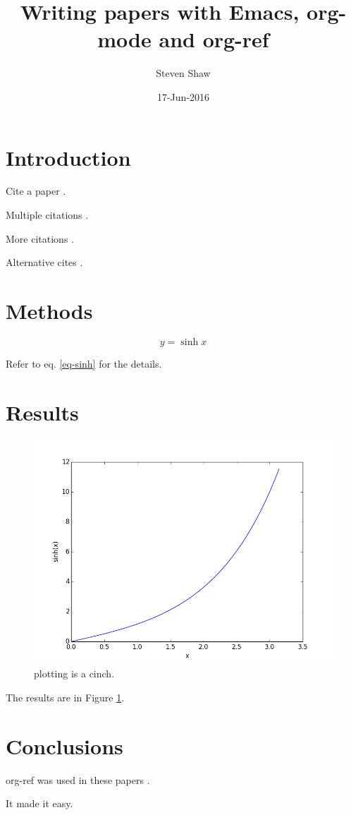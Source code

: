 \documentclass[11pt]{article}
\author{Steven Shaw}
\date{17-Jun-2016}
\title{Writing papers with Emacs, org-mode and org-ref}
\begin{document}
\maketitle

\section{Introduction}
\label{sec:orgheadline1}

Cite a paper \cite{hughes-why}.

Multiple citations \cite{not-a-number,why-dependent-types-matter}.

More citations \cite{ffi,secd,filinski-nbesem,nbe-filinski,rbtree}.

Alternative cites .

\section{Methods}
\label{sec:orgheadline2}

\begin{equation} \label{eq-sinh}
y = \sinh x
\end{equation}

Refer to eq. \eqref{eq-sinh} for the details.

\section{Results}
\label{sec:orgheadline3}

\begin{figure}[H]
\centering
\includegraphics[width=.9\linewidth]{./sinh.png}
\caption{plotting is a cinch. \label{fig-cinch}}
\end{figure}

The results are in Figure \ref{fig-cinch}.

\section{Conclusions}
\label{sec:orgheadline4}

org-ref was used in these papers \cite{view-left,not-a-number,extt,mcbride-snr-thesis}.

It made it easy.



\end{document}
